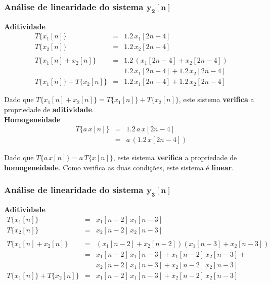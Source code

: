 \documentclass[a4paper]{article}
\begin{document}
\subsubsection{Análise de linearidade do sistema $\mathbf{y_{2}[n]}$}
\noindent \textbf{Aditividade}
\begin{eqnarray}
	T\{x_{1}[n]\}					& = & 1.2 \, x_{1}[2n - 4] \\
	T\{x_{2}[n]\}					& = & 1.2 \, x_{2}[2n - 4] \\
	\nonumber \\
	T\{x_{1}[n] + x_{2}[n]\}		& = & 1.2 \, (x_{1}[2n - 4] + x_{2}[2n - 4]) \\
									& = & 1.2 \, x_{1}[2n - 4] + 1.2 \, x_{2}[2n - 4] \\
	T\{x_{1}[n]\} + T\{x_{2}[n]\}	& = & 1.2 \, x_{1}[2n - 4] + 1.2 \, x_{2}[2n - 4]
\end{eqnarray}

\noindent Dado que $T\{x_{1}[n] + x_{2}[n]\} = T\{x_{1}[n]\} + T\{x_{2}[n]\}$, este sistema \textbf{verifica} a propriedade de \textbf{aditividade}. \\

\noindent \textbf{Homogeneidade}
\begin{eqnarray}
	T\{a \, x[n]\}					& = & 1.2 \, a \, x[2n - 4] \\
									& = & a \, (1.2 \, x[2n - 4])
\end{eqnarray}

\noindent Dado que $T\{a \, x[n]\} = a \, T\{x[n]\}$, este sistema \textbf{verifica} a propriedade de \textbf{homogeneidade}. Como verifica as duas condições, este sistema é \textbf{linear}.

\subsubsection{Análise de linearidade do sistema $\mathbf{y_{3}[n]}$}
\noindent \textbf{Aditividade}
\begin{eqnarray}
	T\{x_{1}[n]\}					& = & x_{1}[n - 2] \, x_{1}[n - 3] \\
	T\{x_{2}[n]\}					& = & x_{2}[n - 2] \, x_{2}[n - 3] \\
	\nonumber \\
	T\{x_{1}[n] + x_{2}[n]\}		& = & (x_{1}[n - 2] + x_{2}[n - 2]) (x_{1}[n - 3] + x_{2}[n - 3]) \\
									& = & x_{1}[n - 2] \, x_{1}[n - 3] + x_{1}[n - 2] \, x_{2}[n - 3] + \nonumber \\ && x_{2}[n - 2] \, x_{1}[n - 3] + x_{2}[n - 2] \, x_{2}[n - 3] \\
	T\{x_{1}[n]\} + T\{x_{2}[n]\}	& = & x_{1}[n - 2] \, x_{1}[n - 3] + x_{2}[n - 2] \, x_{2}[n - 3]
\end{eqnarray}
\end{document}
